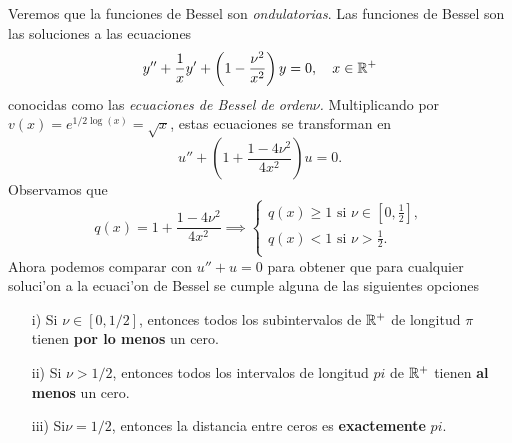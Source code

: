 \documentclass[main.tex]{subfiles}
\begin{document}
\eje Veremos que la funciones de Bessel son \emph{ondulatorias}. Las funciones de Bessel son las soluciones a las ecuaciones
\begin{equation}\label{eq-bessel}
  y''+\frac{1}{x}y'+\left(1-\frac{\nu^{2}}{x^{2}}\right)y=0,\quad x\in\mathbb R ^{+}
\end{equation}
conocidas como las \emph{ecuaciones de Bessel de orden\(\nu\).} Multiplicando por \(v(x)=e^{1/2\log(x)}=\sqrt{x}\), estas ecuaciones se transforman en
\[
  u''+\left(1+\frac{1-4\nu^{2}}{4x^{2}}\right)u=0.
\]
Observamos que
\[
  q(x)=1+\frac{1-4\nu^{2}}{4x^{2}}\implies\begin{cases}
                                          q(x)\geq1\text{ si } \nu\in[0,\frac{1}{2}],\\
                                          q(x)<1\text{ si } \nu>\frac{1}{2}.\\
                                         \end{cases}
\]
Ahora podemos comparar con \(u''+u=0\) para obtener que para cualquier soluci'on a la ecuaci'on de Bessel se cumple alguna de las siguientes opciones
\begin{enumerate}
\item[i)] Si \(\nu\in[0,1/2]\), entonces todos los subintervalos de \(\mathbb R ^{+}\) de longitud \(\pi\) tienen \textbf{por lo menos} un cero.
\item[ii)] Si \(\nu>1/2\), entonces todos los intervalos de longitud \(pi\) de \(\mathbb R ^{+}\) tienen \textbf{al menos} un cero.
\item[iii)]Si\(\nu=1/2\), entonces la distancia entre ceros es \textbf{exactemente} \(pi\).

\end{enumerate}
\end{document}
